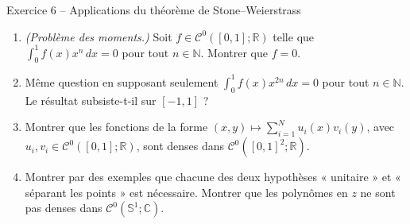 \documentclass[11pt,a4paper]{article}
\newcommand{\R}{\mathbb{R}}
\newcommand{\N}{\mathbb{N}}
\newcommand{\C}{\mathbb{C}}
\newcommand{\Sun}{\mathbb{S}^1}
\newcommand{\Cz}{\mathcal{C}^0}
\theoremstyle{definition}
\begin{document}
\begin{exo}{Exercice 6 -- Applications du théorème de Stone--Weierstrass}
\begin{enumerate}[label=(\alph*)]
  \item \emph{(Problème des moments.)} Soit $f\in\Cz([0,1];\R)$ telle que $\int_0^1f(x)x^n\,dx=0$ pour tout $n\in\N$. Montrer que $f=0$.
  \item Même question en supposant seulement $\int_0^1f(x)x^{2n}\,dx=0$ pour tout $n\in\N$. Le résultat subsiste-t-il sur $[-1,1]$ ?
  \item Montrer que les fonctions de la forme $(x,y)\mapsto\sum_{i=1}^Nu_i(x)v_i(y)$, avec $u_i,v_i\in\Cz([0,1];\R)$, sont denses dans $\Cz([0,1]^2;\R)$.
  \item Montrer par des exemples que chacune des deux hypothèses « unitaire » et « séparant les points » est nécessaire. Montrer que les polynômes en $z$ ne sont pas denses dans $\Cz(\Sun;\C)$.
\end{enumerate}
\end{exo}
\end{document}
